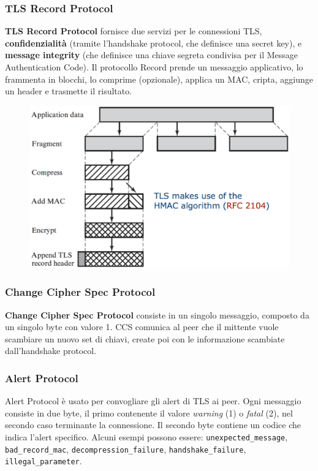 \documentclass[11pt]{article}
\begin{document}
\subsubsection{TLS Record Protocol}
\textbf{TLS Record Protocol} fornisce due servizi per le connessioni TLS, \textbf{confidenzialità} (tramite l'handshake protocol, che definisce una secret key), e \textbf{message integrity} (che definisce una chiave segreta condivisa per il Message Authentication Code). Il protocollo Record prende un messaggio applicativo, lo frammenta in blocchi, lo comprime (opzionale), applica un MAC, cripta, aggiunge un header e trasmette il risultato. 
\begin{figure}[H]
    \centering
    \includegraphics[width=0.7\linewidth]{res/crypto/TLSRecord.png}
\end{figure}
\subsubsection{Change Cipher Spec Protocol}
\textbf{Change Cipher Spec Protocol} consiste in un singolo messaggio, composto da un singolo byte con valore 1. CCS comunica al peer che il mittente vuole scambiare un nuovo set di chiavi, create poi con le informazione scambiate dall'handshake protocol. 
\subsubsection{Alert Protocol}
Alert Protocol è usato per convogliare gli alert di TLS ai peer. Ogni messaggio consiste in due byte, il primo contenente il valore \textit{warning} (1) o \textit{fatal} (2), nel secondo caso terminante la connessione. Il secondo byte contiene un codice che indica l'alert specifico. 
Alcuni esempi possono essere: \verb|unexpected_message|, \verb|bad_record_mac|, \verb|decompression_failure|, \verb|handshake_failure|, \verb|illegal_parameter|.
\end{document}
